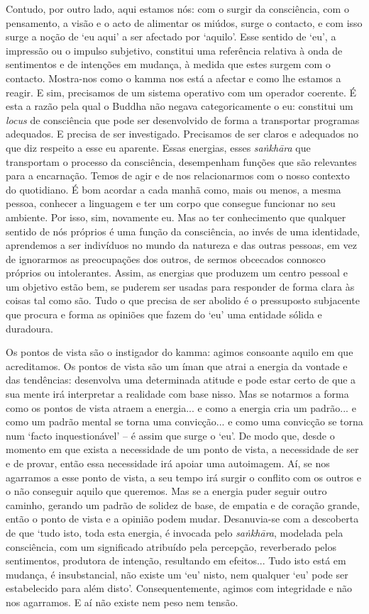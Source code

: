 Contudo, por outro lado, aqui estamos nós: com o surgir da consciência, com o pensamento, a visão e o acto de alimentar os miúdos, surge o contacto, e com isso surge a noção de `eu aqui' a ser afectado por `aquilo'. Esse sentido de `eu', a impressão ou o impulso subjetivo, constitui uma referência relativa à onda de sentimentos e de intenções em mudança, à medida que estes surgem com o contacto. Mostra-nos como o kamma nos está a afectar e como lhe estamos a reagir. E sim, precisamos de um sistema operativo com um operador coerente. É esta a razão pela qual o Buddha não negava categoricamente o eu: constitui um \emph{locus} de consciência que pode ser desenvolvido de forma a transportar programas adequados. E precisa de ser investigado. Precisamos de ser claros e adequados no que diz respeito a esse eu aparente. Essas energias, esses \emph{saṅkhāra} que transportam o processo da consciência, desempenham funções que são relevantes para a encarnação. Temos de agir e de nos relacionarmos com o nosso contexto do quotidiano. É bom acordar a cada manhã como, mais ou menos, a mesma pessoa, conhecer a linguagem e ter um corpo que consegue funcionar no seu ambiente. Por isso, sim, novamente eu. Mas ao ter conhecimento que qualquer sentido de nós próprios é uma função da consciência, ao invés de uma identidade, aprendemos a ser indivíduos no mundo da natureza e das outras pessoas, em vez de ignorarmos as preocupações dos outros, de sermos obcecados connosco próprios ou intolerantes. Assim, as energias que produzem um centro pessoal e um objetivo estão bem, se puderem ser usadas para responder de forma clara às coisas tal como são. Tudo o que precisa de ser abolido é o pressuposto subjacente que procura e forma as opiniões que fazem do `eu' uma entidade sólida e duradoura.

Os pontos de vista são o instigador do kamma: agimos consoante aquilo em que acreditamos. Os pontos de vista são um íman que atrai a energia da vontade e das tendências: desenvolva uma determinada atitude e pode estar certo de que a sua mente irá interpretar a realidade com base nisso. Mas se notarmos a forma como os pontos de vista atraem a energia... e como a energia cria um padrão... e como um padrão mental se torna uma convicção... e como uma convicção se torna num `facto inquestionável' -- é assim que surge o `eu'. De modo que, desde o momento em que exista a necessidade de um ponto de vista, a necessidade de ser e de provar, então essa necessidade irá apoiar uma autoimagem. Aí, se nos agarramos a esse ponto de vista, a seu tempo irá surgir o conflito com os outros e o não conseguir aquilo que queremos. Mas se a energia puder seguir outro caminho, gerando um padrão de solidez de base, de empatia e de coração grande, então o ponto de vista e a opinião podem mudar. Desanuvia-se com a descoberta de que `tudo isto, toda esta energia, é invocada pelo \emph{saṅkhāra}, modelada pela consciência, com um significado atribuído pela percepção, reverberado pelos sentimentos, produtora de intenção, resultando em efeitos... Tudo isto está em mudança, é insubstancial, não existe um `eu' nisto, nem qualquer `eu' pode ser estabelecido para além disto'. Consequentemente, agimos com integridade e não nos agarramos. E aí não existe nem peso nem tensão.

